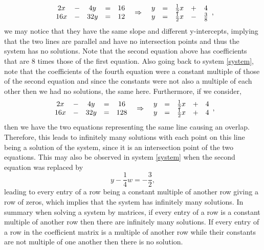 \documentclass{ximera}
\begin{document}
\begin{example}
\[\begin{array}{ccccc}
     2x& -&4y&=&16\\
     16x &-& 32y&=& 12
\end{array}
\hspace{.2cm}\Rightarrow \hspace{.2cm}
\begin{array}{ccccc}
     y&=&\frac{1}{2}x&+&4\\
     y &=& \frac{1}{2}x&-& \frac{3}{8}
\end{array},
\]
we may notice that they have the same slope and different y-intercepts, implying that the two lines are parallel and have no intersection points and thus the system has no solutions. Note that the second equation above has coefficients that are $8$ times those of the first equation. Also going back to system \eqref{system}, note that the coefficients of the fourth equation were a constant multiple of those of the second equation and since the constants were not also a multiple of each other then we had no solutions, the same here. Furthermore, if we consider,
\[
\begin{array}{ccccc}
     2x& -&4y&=&16\\
     16x &-& 32y&=& 128
\end{array}
\hspace{.2cm}\Rightarrow \hspace{.2cm}
\begin{array}{ccccc}
     y&=&\frac{1}{2}x&+&4\\
     y &=& \frac{1}{2}x&+& 4
\end{array},
\]
then we have the two equations representing the same line causing an overlap. Therefore, this leads to infinitely many solutions with each point on this line being a solution of the system, since it is an intersection point of the two equations. This may also be observed in system \eqref{system} when the second equation was replaced by
\begin{equation*}
y-\frac{1}{4}w= -\frac{3}{2},
\end{equation*}
leading to every entry of a row being a constant multiple of another row giving a row of zeros, which implies that the system has infinitely many solutions. In summary when solving a system by matrices, if every entry of a row is a constant multiple of another row then there are infinitely many solutions. If every entry of a row in the coefficient matrix is a multiple of another row while their constants are not multiple of one another then there is no solution.


\end{example}
\end{document}
